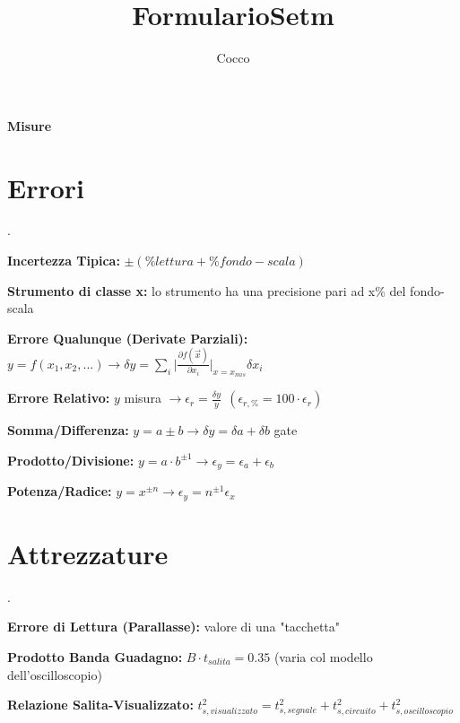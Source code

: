 \documentclass[12pt]{extarticle}
\title{FormularioSetm}
\author{{Cocco}}
\date{}
\begin{document}
\thispagestyle{empty}
{\bf \huge Misure}
\section{Errori}.


{\bf Incertezza Tipica:} $\pm (\% lettura + \% fondo-scala) $

{\bf Strumento di classe x:} lo strumento ha una precisione pari ad x\% del fondo-scala


{\bf Errore Qualunque (Derivate Parziali):} $\displaystyle y = f(x_1, x_2, ...) \to \delta y  = \sum_i \Bigg |\frac{\partial f(\vec{x})}{\partial x_i}\Bigg |_{x=x_{mis}} \delta x_i $

{\bf Errore Relativo:} $y$ misura $\displaystyle\to \epsilon_r = \frac{\delta y}{y} \ \ (\epsilon_{r, \%} = 100\cdot\epsilon_r)$

{\bf Somma/Differenza:} $y = a \pm b \to \delta y = \delta a + \delta b$ gate


{\bf Prodotto/Divisione:} $\displaystyle y = a\cdot b^{\pm 1} \to \epsilon_y = \epsilon_a + \epsilon_b$

{\bf Potenza/Radice:} $\displaystyle y = x^{\pm n} \to \epsilon_y = n^{\pm 1}\epsilon_x$

\section{Attrezzature}. 





{\bf Errore di Lettura (Parallasse):} valore di una "tacchetta"

{\bf Prodotto Banda Guadagno:} $ B\cdot t_{salita} = 0.35 $ (varia col modello dell'oscilloscopio)

{\bf Relazione Salita-Visualizzato:} $\displaystyle t_{s, visualizzato}^2 = t_{s, segnale}^2 + t_{s, circuito}^2 + t_{s, oscilloscopio}^2$
\end{document}
